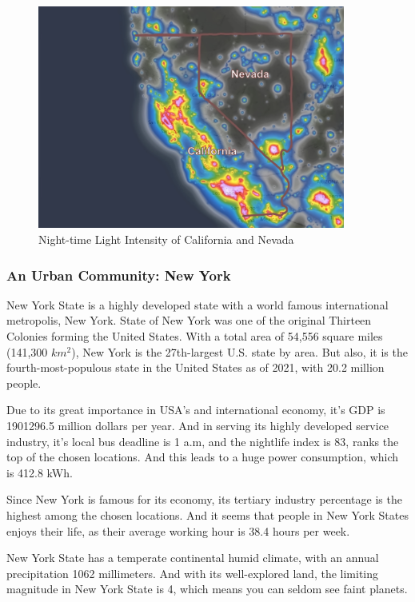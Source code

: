 \begin{figure}[H]\centering
    \includegraphics[width=0.9\textwidth]{figures/texted/Nevada.jpg}
    \caption{Night-time Light Intensity of California and Nevada} \label{fig:figure4}
\end{figure}


\subsubsection{An Urban Community: New York}
New York State is a highly developed state with a world famous international metropolis, New York. State of New York was one of the original Thirteen Colonies forming the United States. With a total area of 54,556 square miles (141,300 $km^2$), New York is the 27th-largest U.S. state by area. But also, it is the fourth-most-populous state in the United States as of 2021, with 20.2 million people.

Due to its great importance in USA's and international economy, it's GDP is 1901296.5 million dollars per year. And in serving its highly developed service industry, it's local bus deadline is 1 a.m, and the nightlife index is 83, ranks the top of the chosen locations. And this leads to a huge power consumption, which is 412.8 kWh. 

Since New York is famous for its economy, its tertiary industry percentage is the highest among the chosen locations. And it seems that people in New York States enjoys their life, as their average working hour is 38.4 hours per week.

New York State has a temperate continental humid climate, with an annual precipitation 1062 millimeters. And with its well-explored land, the limiting magnitude in New York State is 4, which means you can seldom see faint planets.

